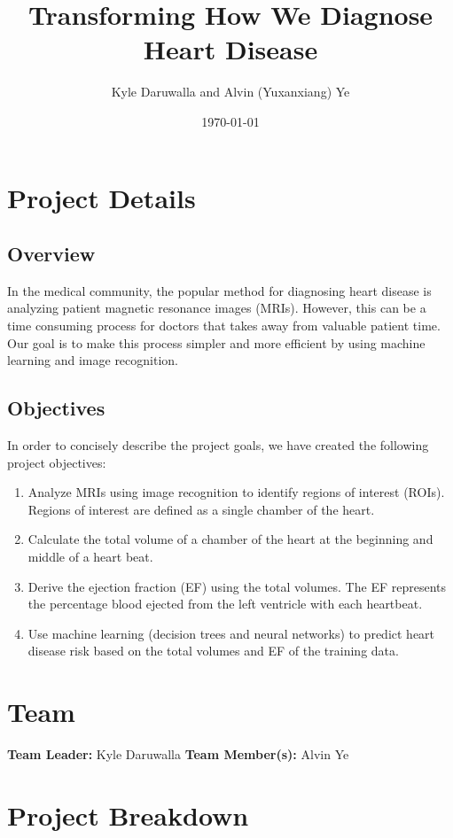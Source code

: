 \documentclass[12pt]{article}
\title{Transforming How We Diagnose Heart Disease}
\author{Kyle Daruwalla and Alvin (Yuxanxiang) Ye}
\date{\today}
\begin{document}
	
\maketitle

\section{Project Details}

\subsection{Overview}
In the medical community, the popular method for diagnosing heart disease is analyzing patient magnetic resonance images (MRIs). However, this can be a time consuming process for doctors that takes away from valuable patient time. Our goal is to make this process simpler and more efficient by using machine learning and image recognition.

\subsection{Objectives}
In order to concisely describe the project goals, we have created the following project objectives:
\begin{enumerate}
	\item Analyze MRIs using image recognition to identify regions of interest (ROIs). Regions of interest are defined as a single chamber of the heart.
	\item Calculate the total volume of a chamber of the heart at the beginning and middle of a heart beat.
	\item Derive the ejection fraction (EF) using the total volumes. The EF represents the percentage blood ejected from the left ventricle with each heartbeat.
	\item Use machine learning (decision trees and neural networks) to predict heart disease risk based on the total volumes and EF of the training data.
\end{enumerate}

\section{Team}
\textbf{Team Leader:} Kyle Daruwalla
\textbf{Team Member(s):} Alvin Ye

\section{Project Breakdown}
\end{document}

